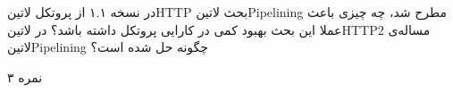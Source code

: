 \documentclass[../main.tex]{subfiles}
\begin{document}

در نسخه ۱.۱ از پروتکل ‌لاتین{HTTP} بحث ‌لاتین{Pipelining} مطرح شد، چه چیزی باعث عملا این بحث بهبود کمی در کارایی پروتکل داشته باشد؟
در ‌لاتین{HTTP2} مساله‌ی ‌لاتین{Pipelining} چگونه حل شده است؟

۳ نمره
\end{document}
